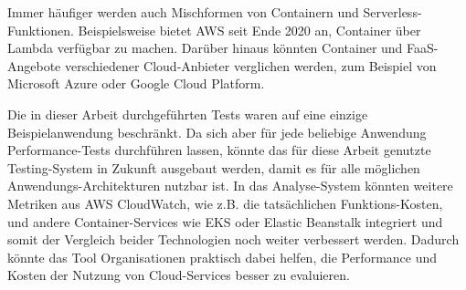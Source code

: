 Immer häufiger werden auch Mischformen von Containern und Serverless-Funktionen. Beispielsweise bietet \ac{AWS} seit Ende 2020 an, Container über Lambda verfügbar zu machen\cite{noauthor_aws_nodate-1}. Darüber hinaus könnten Container und \ac{FaaS}-Angebote verschiedener Cloud-Anbieter verglichen werden, zum Beispiel von Microsoft Azure oder Google Cloud Platform.

Die in dieser Arbeit durchgeführten Tests waren auf eine einzige Beispielanwendung beschränkt. Da sich aber für jede beliebige Anwendung Performance-Tests durchführen lassen, könnte das für diese Arbeit genutzte Testing-System in Zukunft ausgebaut werden, damit es für alle möglichen Anwendungs-Architekturen nutzbar ist. In das Analyse-System könnten weitere Metriken aus \ac{AWS} CloudWatch, wie z.B. die tatsächlichen Funktions-Kosten, und andere Container-Services wie \ac{EKS} oder Elastic Beanstalk integriert und somit der Vergleich beider Technologien noch weiter verbessert werden. Dadurch könnte das Tool Organisationen praktisch dabei helfen, die Performance und Kosten der Nutzung von Cloud-Services besser zu evaluieren.
